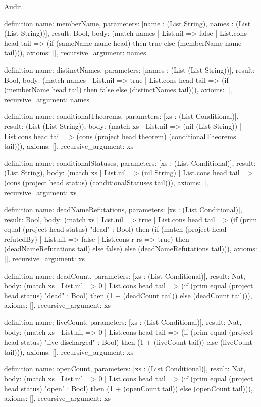 \begin{lexlean}{Audit}
\begin{semanticmodule}
definition{
  name: memberName,
  parameters: [name : (List String), names : (List (List String))],
  result: Bool,
  body: (match names
    | List.nil => false
    | List.cons head tail => (if (sameName name head) then true else (memberName name tail))),
  axioms: [],
  recursive_argument: names
}

definition{
  name: distinctNames,
  parameters: [names : (List (List String))],
  result: Bool,
  body: (match names
    | List.nil => true
    | List.cons head tail => (if (memberName head tail) then false else (distinctNames tail))),
  axioms: [],
  recursive_argument: names
}

definition{
  name: conditionalTheorems,
  parameters: [xs : (List Conditional)],
  result: (List (List String)),
  body: (match xs
    | List.nil => (nil (List String))
    | List.cons head tail => (cons (project head theorem) (conditionalTheorems tail))),
  axioms: [],
  recursive_argument: xs
}

definition{
  name: conditionalStatuses,
  parameters: [xs : (List Conditional)],
  result: (List String),
  body: (match xs
    | List.nil => (nil String)
    | List.cons head tail => (cons (project head status) (conditionalStatuses tail))),
  axioms: [],
  recursive_argument: xs
}

definition{
  name: deadNameRefutations,
  parameters: [xs : (List Conditional)],
  result: Bool,
  body: (match xs
    | List.nil => true
    | List.cons head tail => (if (prim equal (project head status) "dead" : Bool) then (if (match (project head refutedBy)
    | List.nil => false
    | List.cons r rs => true) then (deadNameRefutations tail) else false) else (deadNameRefutations tail))),
  axioms: [],
  recursive_argument: xs
}

definition{
  name: deadCount,
  parameters: [xs : (List Conditional)],
  result: Nat,
  body: (match xs
    | List.nil => 0
    | List.cons head tail => (if (prim equal (project head status) "dead" : Bool) then (1 + (deadCount tail)) else (deadCount tail))),
  axioms: [],
  recursive_argument: xs
}

definition{
  name: liveCount,
  parameters: [xs : (List Conditional)],
  result: Nat,
  body: (match xs
    | List.nil => 0
    | List.cons head tail => (if (prim equal (project head status) "live-discharged" : Bool) then (1 + (liveCount tail)) else (liveCount tail))),
  axioms: [],
  recursive_argument: xs
}

definition{
  name: openCount,
  parameters: [xs : (List Conditional)],
  result: Nat,
  body: (match xs
    | List.nil => 0
    | List.cons head tail => (if (prim equal (project head status) "open" : Bool) then (1 + (openCount tail)) else (openCount tail))),
  axioms: [],
  recursive_argument: xs
}


\end{semanticmodule}
\end{lexlean}
